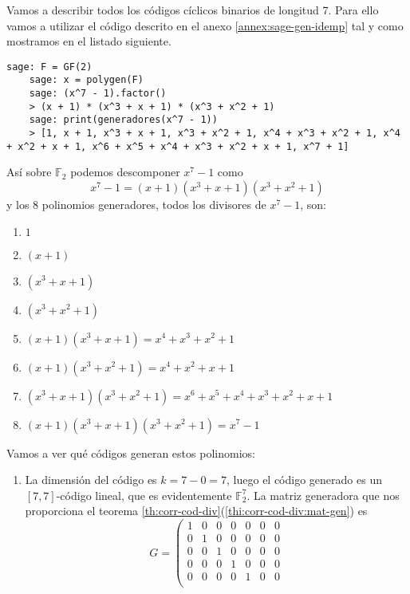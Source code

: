 \begin{example}
  \label{ex:codigos-ciclicos-long-7}
  Vamos a describir todos los códigos cíclicos binarios de longitud 7.
  Para ello vamos a utilizar el código descrito en el anexo \ref{annex:sage-gen-idemp} tal y como mostramos en el listado siguiente.
  \begin{lstlisting}[gobble=4]
    sage: F = GF(2)
    sage: x = polygen(F)
    sage: (x^7 - 1).factor()
    > (x + 1) * (x^3 + x + 1) * (x^3 + x^2 + 1)
    sage: print(generadores(x^7 - 1))
    > [1, x + 1, x^3 + x + 1, x^3 + x^2 + 1, x^4 + x^3 + x^2 + 1, x^4 + x^2 + x + 1, x^6 + x^5 + x^4 + x^3 + x^2 + x + 1, x^7 + 1]
  \end{lstlisting}
  Así sobre \(\mathbb F_2\) podemos descomponer \(x^7 - 1\) como \[
    x^7 - 1 = (x + 1)(x^{3} + x + 1)(x^{3} + x^{2} + 1)
  \]
  y los 8 polinomios generadores, todos los divisores de \(x^7 - 1\), son: \begin{enumerate}
    \item \(1\)
    \item \((x + 1)\)
    \item \((x^{3} + x + 1)\)
    \item \((x^{3} + x^{2} + 1)\)
    \item \((x + 1)(x^{3} + x + 1) = x^4 + x^3 + x^2 + 1\)
    \item \((x + 1)(x^{3} + x^{2} + 1) = x^4 + x^2 + x + 1\)
    \item \((x^{3} + x + 1)(x^{3} + x^{2} + 1) = x^6 + x^5 + x^4 + x^3 + x^2 + x + 1\)
    \item \((x + 1)(x^{3} + x + 1)(x^{3} + x^{2} + 1) = x^7 - 1\)
  \end{enumerate}
  Vamos a ver qué códigos generan estos polinomios: \begin{enumerate}
    \item La dimensión del código es \(k = 7 - 0 = 7\), luego el código generado es un \([7, 7]\)-código lineal, que es evidentemente \(\mathbb F_2^7\). La matriz generadora que nos proporciona el teorema \ref{th:corr-cod-div}(\ref{thi:corr-cod-div:mat-gen}) es \[
      G = \left(\begin{array}{rrrrrrr}
        1 & 0 & 0 & 0 & 0 & 0 & 0 \\
        0 & 1 & 0 & 0 & 0 & 0 & 0 \\
        0 & 0 & 1 & 0 & 0 & 0 & 0 \\
        0 & 0 & 0 & 1 & 0 & 0 & 0 \\
        0 & 0 & 0 & 0 & 1 & 0 & 0 \\

\end{array}\]
\end{enumerate}
\end{example}
